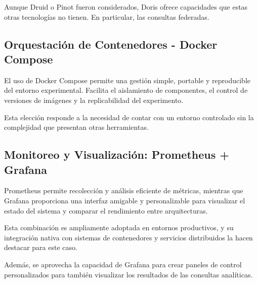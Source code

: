 Aunque Druid o Pinot fueron considerados, 
Doris ofrece capacidades que estas otras tecnologías no tienen. En particular, las consultas federadas.

\subsection*{Orquestación de Contenedores - Docker Compose}

El uso de Docker Compose permite una gestión simple, portable y reproducible del entorno experimental. 
Facilita el aislamiento de componentes, el control de versiones de imágenes y la replicabilidad del experimento. \newline

Esta elección responde a la necesidad de contar con un entorno controlado sin la complejidad que presentan otras herramientas.

\subsection*{Monitoreo y Visualización: Prometheus + Grafana}

Prometheus permite recolección y análisis eficiente de métricas, 
mientras que Grafana proporciona una interfaz amigable y personalizable para visualizar el estado del sistema y comparar el rendimiento entre arquitecturas. 

Esta combinación es ampliamente adoptada en entornos productivos, y su integración nativa con sistemas de contenedores y servicios distribuidos la hacen destacar para este caso.

Además, se aprovecha la capacidad de Grafana para crear paneles de control personalizados 
para también visualizar los resultados de las consultas analíticas.

\newpage